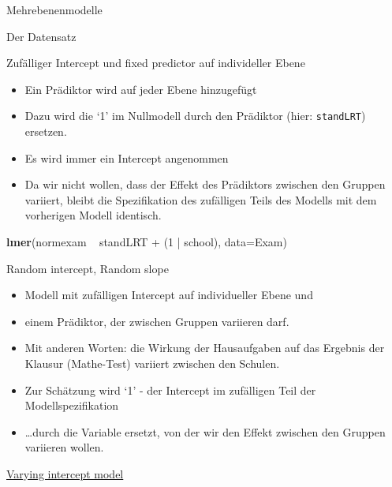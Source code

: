 \documentclass[ignorenonframetext,]{beamer}
\newenvironment{Shaded}{}{}
\newcommand{\KeywordTok}[1]{\textcolor[rgb]{0.00,0.44,0.13}{\textbf{{#1}}}}
\newcommand{\DataTypeTok}[1]{\textcolor[rgb]{0.56,0.13,0.00}{{#1}}}
\newcommand{\DecValTok}[1]{\textcolor[rgb]{0.25,0.63,0.44}{{#1}}}
\newcommand{\StringTok}[1]{\textcolor[rgb]{0.25,0.44,0.63}{{#1}}}
\newcommand{\NormalTok}[1]{{#1}}
\providecommand{\tightlist}{%
\setlength{\itemsep}{0pt}\setlength{\parskip}{0pt}}
\begin{document}
\begin{frame}[fragile]{Mehrebenenmodelle}
\begin{block}{Der Datensatz}
\end{block}

\begin{block}{Zufälliger Intercept und fixed predictor auf individeller
Ebene}

\begin{itemize}
\tightlist
\item
  Ein Prädiktor wird auf jeder Ebene hinzugefügt
\item
  Dazu wird die `1' im Nullmodell durch den Prädiktor (hier:
  \texttt{standLRT}) ersetzen.
\item
  Es wird immer ein Intercept angenommen
\item
  Da wir nicht wollen, dass der Effekt des Prädiktors zwischen den
  Gruppen variiert, bleibt die Spezifikation des zufälligen Teils des
  Modells mit dem vorherigen Modell identisch.
\end{itemize}

\begin{Shaded}
\begin{Highlighting}[]
\KeywordTok{lmer}\NormalTok{(normexam ~}\StringTok{ }\NormalTok{standLRT +}\StringTok{ }\NormalTok{(}\DecValTok{1} \NormalTok{|}\StringTok{ }\NormalTok{school), }\DataTypeTok{data=}\NormalTok{Exam)}
\end{Highlighting}
\end{Shaded}

\end{block}

\begin{block}{Random intercept, Random slope}

\begin{itemize}
\item
  Modell mit zufälligen Intercept auf individueller Ebene und
\item
  einem Prädiktor, der zwischen Gruppen variieren darf.
\item
  Mit anderen Worten: die Wirkung der Hausaufgaben auf das Ergebnis der
  Klausur (Mathe-Test) variiert zwischen den Schulen.
\item
  Zur Schätzung wird `1' - der Intercept im zufälligen Teil der
  Modellspezifikation
\item
  \ldots{}durch die Variable ersetzt, von der wir den Effekt zwischen
  den Gruppen variieren wollen.
\end{itemize}

\end{block}

\begin{block}{\href{https://www.jaredknowles.com/journal/2013/11/25/getting-started-with-mixed-effect-models-in-r}{Varying
intercept model}}


\end{block}
\end{frame}
\end{document}
